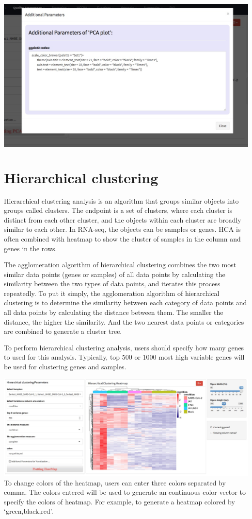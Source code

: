 \documentclass[
  a4paper,
  oneside]{book}
\begin{document}
\includegraphics{images/quality_pca_add.jpeg}

\hypertarget{hierarchical-clustering}{%
\section{Hierarchical clustering}\label{hierarchical-clustering}}

Hierarchical clustering analysis is an algorithm that groups similar objects into groups called clusters. The endpoint is a set of clusters, where each cluster is distinct from each other cluster, and the objects within each cluster are broadly similar to each other. In RNA-seq, the objects can be samples or genes. HCA is often combined with heatmap to show the cluster of samples in the column and genes in the rows.

The agglomeration algorithm of hierarchical clustering combines the two most similar data points (genes or samples) of all data points by calculating the similarity between the two types of data points, and iterates this process repeatedly. To put it simply, the agglomeration algorithm of hierarchical clustering is to determine the similarity between each category of data points and all data points by calculating the distance between them. The smaller the distance, the higher the similarity. And the two nearest data points or categories are combined to generate a cluster tree.

To perform hierarchical clustering analysis, users should specify how many genes to used for this analysis. Typically, top 500 or 1000 most high variable genes will be used for clustering genes and samples.

\includegraphics{images/quality_hca.jpeg}
To change colors of the heatmap, users can enter three colors separated by comma. The colors entered will be used to generate an continuous color vector to specify the colors of heatmap. For example, to generate a heatmap colored by `green,black,red'.
\end{document}
